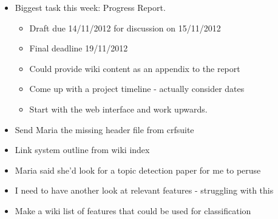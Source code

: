\begin{itemize}
\item
  Biggest task this week: Progress Report.

  \begin{itemize}
  \item
    Draft due 14/11/2012 for discussion on 15/11/2012
  \item
    Final deadline 19/11/2012
  \item
    Could provide wiki content as an appendix to the report
  \item
    Come up with a project timeline - actually consider dates
  \item
    Start with the web interface and work upwards.
  \end{itemize}
\item
  Send Maria the missing header file from crfsuite
\item
  Link system outline from wiki index
\item
  Maria said she'd look for a topic detection paper for me to peruse
\item
  I need to have another look at relevant features - struggling with
  this
\item
  Make a wiki list of features that could be used for classification
\end{itemize}
